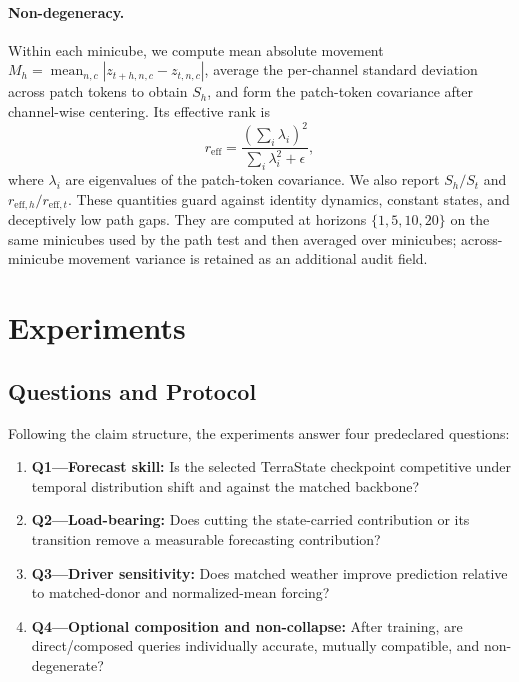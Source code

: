 \documentclass[letterpaper]{article} %
\begin{document}
\paragraph{Non-degeneracy.}
Within each minicube, we compute mean absolute movement
$M_h=\operatorname{mean}_{n,c}|z_{t+h,n,c}-z_{t,n,c}|$, average the
per-channel standard deviation across patch tokens to obtain $S_h$, and form
the patch-token covariance after channel-wise centering. Its effective rank is
\begin{equation}
r_{\mathrm{eff}}=
\frac{(\sum_i\lambda_i)^2}{\sum_i\lambda_i^2+\epsilon},
\label{eq:erank}
\end{equation}
where $\lambda_i$ are eigenvalues of the patch-token covariance. We also report
$S_h/S_t$ and $r_{\mathrm{eff},h}/r_{\mathrm{eff},t}$. These quantities guard
against identity dynamics, constant states, and deceptively low path gaps. They
are computed at horizons $\{1,5,10,20\}$ on the same minicubes used by the path
test and then averaged over minicubes; across-minicube movement variance is
retained as an additional audit field.

\section{Experiments}

\subsection{Questions and Protocol}

Following the claim structure, the experiments answer four predeclared
questions:
\begin{enumerate}
    \item \textbf{Q1---Forecast skill:} Is the selected TerraState checkpoint competitive under temporal distribution shift and against the matched backbone?
    \item \textbf{Q2---Load-bearing:} Does cutting the state-carried contribution or its transition remove a measurable forecasting contribution?
    \item \textbf{Q3---Driver sensitivity:} Does matched weather improve prediction relative to matched-donor and normalized-mean forcing?
    \item \textbf{Q4---Optional composition and non-collapse:} After training,
    are direct/composed queries individually accurate, mutually compatible, and
    non-degenerate?
\end{enumerate}
\end{document}

